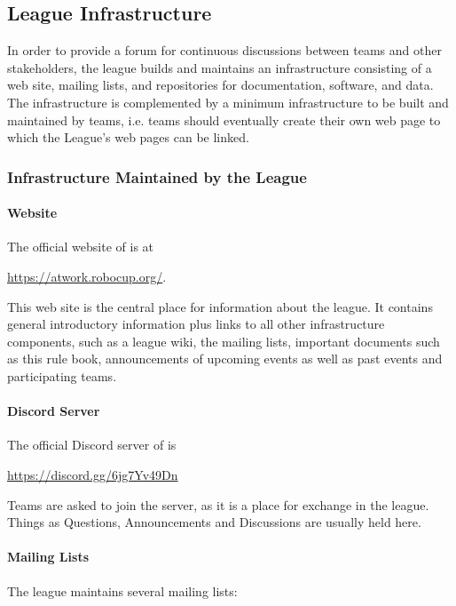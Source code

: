 \subsection{League Infrastructure}
\label{ssec:LeagueInfrastructure}

In order to provide a forum for continuous discussions between teams and other stakeholders, the league builds and maintains an infrastructure consisting of a web site, mailing lists, and repositories for documentation, software, and data. The infrastructure is complemented by a minimum infrastructure to be built and maintained by teams, i.e. teams should eventually create their own web page to which the \RCAW League's web pages can be linked.


\subsubsection{Infrastructure Maintained by the League} 

\paragraph{Website}
The official website of \RCAW is at
\begin{center}
\url{https://atwork.robocup.org/}.
\end{center}

This web site is the central place for information about the league. It contains general introductory information plus links to all other infrastructure components, such as a league wiki, the mailing lists, important documents such as this rule book, announcements of upcoming events as well as past events and participating teams.


\paragraph{Discord Server}
The official Discord server of \RCAW is
\begin{center}
	\href{Official Discord Server}{https://discord.gg/6jg7Yv49Dn}
\end{center}

Teams are asked to join the server, as it is a place for exchange in the league. 
Things as Questions, Announcements and Discussions are usually held here.

\paragraph{Mailing Lists}
The league maintains several mailing lists:

